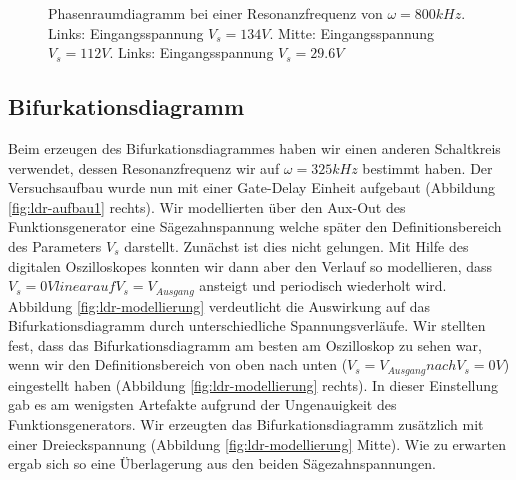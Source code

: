 \documentclass[12pt,a4paper]{article}
\begin{document}
\begin{figure}[!htbp]
\caption{Phasenraumdiagramm bei einer Resonanzfrequenz von $\omega=800kHz$. Links: Eingangsspannung $V_s=134V$. Mitte: Eingangsspannung $V_s=112V$. Links: Eingangsspannung $V_s=29.6V$}
\label{fig:ldr-real2}
\end{figure}
\subsection { Bifurkationsdiagramm }
Beim erzeugen des Bifurkationsdiagrammes haben wir einen anderen Schaltkreis verwendet, dessen Resonanzfrequenz wir auf $\omega=325kHz$ bestimmt haben. Der Versuchsaufbau wurde nun mit einer Gate-Delay Einheit aufgebaut (Abbildung \ref{fig:ldr-aufbau1} rechts). Wir modellierten über den Aux-Out des Funktionsgenerator eine Sägezahnspannung welche später den Definitionsbereich des Parameters $V_s$ darstellt. 
Zunächst ist dies nicht gelungen. Mit Hilfe des digitalen Oszilloskopes konnten wir dann aber den Verlauf so modellieren, dass  $V_s=0V linear auf V_s=V_{Ausgang}$ ansteigt und periodisch wiederholt wird.
Abbildung \ref{fig:ldr-modellierung} verdeutlicht die Auswirkung auf das Bifurkationsdiagramm durch unterschiedliche Spannungsverläufe.
Wir stellten fest, dass das Bifurkationsdiagramm am besten am Oszilloskop zu sehen war, wenn wir den Definitionsbereich von oben nach unten ($V_s=V_{Ausgang} nach V_s=0V$) eingestellt haben (Abbildung \ref{fig:ldr-modellierung} rechts). In dieser Einstellung gab es am wenigsten Artefakte aufgrund der Ungenauigkeit des Funktionsgenerators. Wir erzeugten das Bifurkationsdiagramm zusätzlich mit einer Dreieckspannung (Abbildung \ref{fig:ldr-modellierung} Mitte). Wie zu erwarten ergab sich so eine Überlagerung aus den beiden Sägezahnspannungen. 
\end{document}
